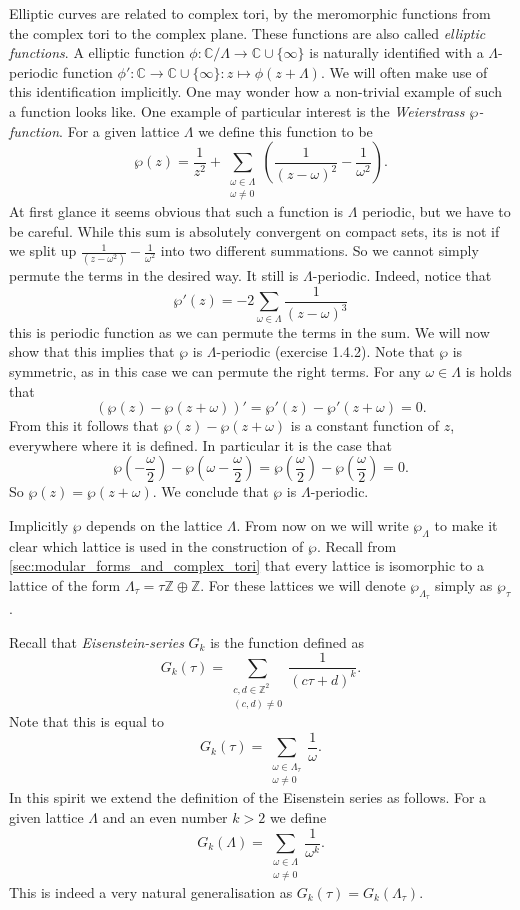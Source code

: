 \documentclass[a4paper]{article}
\theoremstyle{theoremdd}
\theoremstyle{definitiondd}
\theoremstyle{remarkdd}
\newcommand{\Z}{\mathbb{Z}}
\newcommand{\C}{\mathbb{C}}
\begin{document}
Elliptic curves are related to complex tori, by the meromorphic functions from the complex tori to the complex plane. These functions are also called \emph{elliptic functions}. 
A elliptic function $\phi: \C / \Lambda \to \C \cup \{\infty\} $ is naturally identified with a  $\Lambda$-periodic function $\phi': \C \to \C \cup \{\infty\}: z \mapsto \phi(z + \Lambda)$. 
We will often make use of this identification implicitly. 
One may wonder how a non-trivial example of such a function looks like. 
One example of particular interest is the \emph{Weierstrass $\wp$-function}. 
For a given lattice  $\Lambda$ we define this function to be \[
	\wp(z) = \frac{1}{z^2} + \sum_{\substack{\omega \in \Lambda \\ \omega \ne 0}}\left( \frac{1}{(z-\omega)^2} - \frac{1}{\omega^2} \right) 
.\] 
At first glance it seems obvious that such a function is $\Lambda$ periodic, but we have to be careful. 
While this sum is absolutely convergent on compact sets, its is not if we split up $\frac{1}{(z-\omega^2)} - \frac{1}{\omega^2}$ into two different summations. So we cannot simply permute the terms in the desired way. 
It still is $\Lambda$-periodic. Indeed, notice that  \[
	\wp'(z) = -2 \sum_{\omega \in \Lambda} \frac{1}{(z - \omega)^3}
\] 
this is periodic function as we can permute the terms in the sum.
We will now show that this implies that $\wp$ is $\Lambda$-periodic (exercise 1.4.2).
Note that $\wp$ is symmetric, as in this case we can permute the right terms.
For any $\omega \in \Lambda$ is holds that 
\[
	(\wp(z) - \wp(z + \omega))' = \wp'(z) - \wp'(z+ \omega) = 0 
.\] 
From this it follows that $\wp(z) - \wp(z + \omega)$ is a constant function of $z$, everywhere where it is defined.
In particular it is the case that \[
	\wp\left(-\frac{\omega}{2}\right) - \wp\left(\omega - \frac{\omega}{2}\right) = \wp\left(\frac{\omega}{2}\right) - \wp\left(\frac{\omega}{2}\right)  = 0 
.\] 
So $\wp(z) = \wp(z+ \omega)$. 
We conclude that $\wp$ is $\Lambda$-periodic.

Implicitly $\wp$ depends on the lattice $\Lambda$. 
From now on we will write  $\wp_\Lambda$ to make it clear which lattice is used in the construction of $\wp$. 
Recall from \cref{sec:modular_forms_and_complex_tori} that every lattice is isomorphic to a lattice of the form $\Lambda_\tau = \tau\Z \oplus \Z$. For these lattices we will denote $\wp_{\Lambda_\tau}$ simply as $\wp_\tau$.

Recall that \emph{Eisenstein-series} $G_k$ is the function defined as \[
	G_k(\tau) = \sum_{\substack{c, d \in \Z^2 \\ (c, d) \ne 0}} \frac{1}{(c\tau + d)^{k}}
.\] 
Note that this is equal to \[
	G_k(\tau) = \sum_{\substack{\omega \in \Lambda_\tau \\ \omega \ne 0}} \frac{1}{\omega}
.\] 
In this spirit we extend the definition of the Eisenstein series as follows. For a given lattice $\Lambda$ and an even number  $k > 2$ we define \[
	G_k(\Lambda) = \sum_{\substack{\omega \in \Lambda \\ \omega \ne 0}} \frac{1}{\omega^{k}}
.\] 
This is indeed a very natural generalisation as $G_k(\tau) = G_k(\Lambda_\tau)$.
\end{document}
